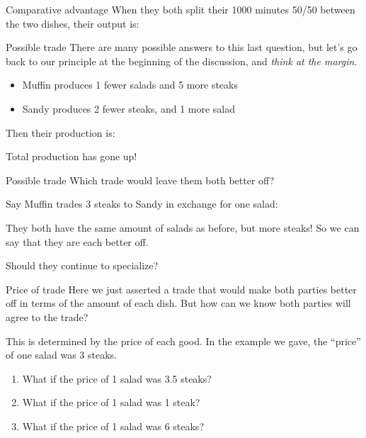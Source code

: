\documentclass[compress]{beamer}
\begin{document}
\begin{frame}{Comparative advantage}
    When they both split their 1000 minutes 50/50 between the two dishes, their output is:

    

\end{frame} 

\begin{frame}{Possible trade}
    There are many possible answers to this last question, but let's go back to our principle at the beginning of the discussion, and \textit{think at the margin}.
    \begin{itemize}
        \item Muffin produces 1 fewer salads and 5 more steaks
        \item Sandy produces 2 fewer steaks, and 1 more salad
    \end{itemize}
    Then their production is:

    

    Total production has gone up!
\end{frame} 

\begin{frame}{Possible trade}
    Which trade would leave them both better off?

    \medskip

    Say Muffin trades 3 steaks to Sandy in exchange for one salad:

    

    They both have the same amount of salads as before, but more steaks! So we can say that they are each better off.

    \medskip
    
    Should they continue to specialize?

\end{frame} 

\begin{frame}{Price of trade}
    Here we just asserted a trade that would make both parties better off in terms of the amount of each dish. But how can we know both parties will agree to the trade?
    
    \medskip

    This is determined by the price of each good. In the example we gave, the ``price'' of one salad was 3 steaks.

    \begin{enumerate}
        \item What if the price of 1 salad was 3.5 steaks?
        \item What if the price of 1 salad was 1 steak?
        \item What if the price of 1 salad was 6 steaks?
    \end{enumerate}
\end{frame}
\end{document}
